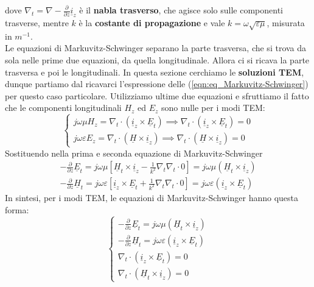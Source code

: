 \documentclass{book}
\begin{document}
    dove $\nabla_{t} = \nabla - \frac{\partial}{\partial z} \underline{i}_{z}$ è il \textbf{nabla trasverso}, che agisce solo
    sulle componenti trasverse, mentre $k$ è la \textbf{costante di propagazione} e vale $k=\omega \sqrt{\varepsilon \mu}$, misurata in $m^{-1}$.
    \\ Le equazioni di Markuvitz-Schwinger separano la parte trasversa, che si trova  da sola nelle prime due equazioni, da quella longitudinale.
    Allora ci si ricava la parte trasversa e poi le longitudinali.
    In questa sezione cerchiamo le \textbf{soluzioni TEM}, dunque partiamo dal ricavarci l'espressione delle (\ref{eqn:eq_Markuvitz-Schwinger}) per questo caso particolare. Utilizziamo ultime due equazioni e sfruttiamo il fatto che le componenti longitudinali 
    $H_{z}$ ed $E_{z}$ sono nulle per i modi TEM:
    \begin{equation}
        \begin{cases}
            j \omega \mu H_{z} = \nabla_{t} \cdot (\underline{i}_{z} \times \underline{E}_{t})  \implies \nabla_{t} \cdot (\underline{i}_{z} \times \underline{E}_{t}) = 0 \\
            j \omega \varepsilon E_{z} = \nabla_{t} \cdot (\underline{H} \times \underline{i}_{z})  \implies \nabla_{t} \cdot (\underline{H} \times \underline{i}_{z}) = 0
        \end{cases}
    \end{equation}
    Sostituendo nella prima e seconda equazione di Markuvitz-Schwinger
    \begin{align}
        -\frac{\partial}{\partial z} \underline{E}_{t} = j \omega \mu [\underline{H}_{t} \times \underline{i}_{z} - \frac{1}{k^{2}}\nabla_{t}\nabla_{t}\cdot 0] = j \omega \mu(\underline{H}_{t} \times \underline{i}_{z}) \\
        -\frac{\partial}{\partial z} \underline{H}_{t} = j \omega \varepsilon [\underline{i}_{z}\times \underline{E}_{t}+\frac{1}{k^{2}}\nabla_{t}\nabla_{t} \cdot 0] = j \omega \varepsilon (\underline{i}_{z} \times \underline{E}_{t})
    \end{align}
    In sintesi, per i modi TEM, le equazioni di Markuvitz-Schwinger hanno questa forma:
    \begin{equation}
        \label{eqn:MS_TEM}
        \begin{cases}
            -\frac{\partial}{\partial z}\underline{E}_{t} = j \omega \mu (\underline{H}_{t} \times \underline{i}_{z}) \\
            -\frac{\partial}{\partial z} \underline{H}_{t} = j \omega \varepsilon (\underline{i}_{z} \times \underline{E}_{t}) \\
            \nabla_{t} \cdot (\underline{i}_{z} \times \underline{E}_{t}) = 0 \\
            \nabla_{t} \cdot (\underline{H}_{t} \times \underline{i}_{z}) = 0
        \end{cases}
    \end{equation}
\end{document}
